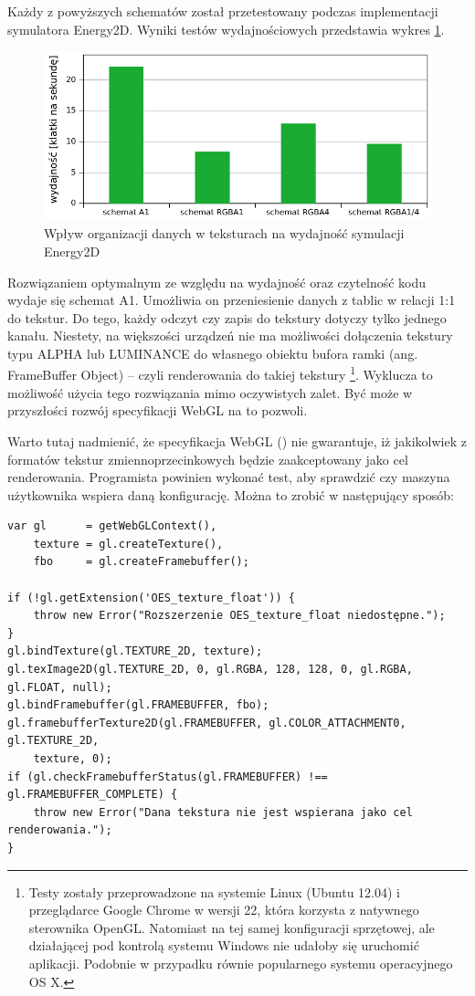 Każdy z powyższych schematów został przetestowany podczas implementacji
symulatora Energy2D. Wyniki testów wydajnościowych przedstawia wykres
\ref{fig:texPerf}.

\begin{figure}[hbp]
\centering
\includegraphics[width=.9\textwidth]{img/texPerf}
\caption{Wpływ organizacji danych w teksturach na wydajność symulacji Energy2D}
\label{fig:texPerf}
\end{figure}

Rozwiązaniem optymalnym ze względu na wydajność oraz czytelność kodu wydaje się
schemat A1. Umożliwia on przeniesienie danych z tablic w relacji 1:1 do tekstur.
Do tego, każdy odczyt czy zapis do tekstury dotyczy tylko jednego kanału.
Niestety, na większości urządzeń nie ma możliwości dołączenia tekstury typu
ALPHA lub LUMINANCE do własnego obiektu bufora ramki (ang. FrameBuffer Object)
-- czyli renderowania do takiej tekstury \footnote{Testy zostały przeprowadzone
na systemie Linux (Ubuntu 12.04) i przeglądarce Google Chrome w wersji 22, która
korzysta z natywnego sterownika OpenGL. Natomiast na tej samej konfiguracji
sprzętowej, ale działającej pod kontrolą systemu Windows nie udałoby się
uruchomić aplikacji. Podobnie w przypadku równie popularnego systemu
operacyjnego OS X.}. Wyklucza to możliwość użycia tego rozwiązania mimo
oczywistych zalet. Być może w przyszłości rozwój specyfikacji WebGL na to
pozwoli.

Warto tutaj nadmienić, że specyfikacja WebGL (\cite{WebGLSpec}) nie gwarantuje,
iż jakikolwiek z formatów tekstur zmiennoprzecinkowych będzie zaakceptowany jako
cel renderowania. Programista powinien wykonać test, aby sprawdzić czy maszyna
użytkownika wspiera daną konfigurację. Można to zrobić w następujący sposób:

\begin{lstlisting}[caption=Weryfikacja poprawności formatu i typu tekstury
używanej jako cel renderowania]
var gl 		= getWebGLContext(),
	texture = gl.createTexture(),
	fbo 	= gl.createFramebuffer();

if (!gl.getExtension('OES_texture_float')) {
	throw new Error("Rozszerzenie OES_texture_float niedostępne.");
}
gl.bindTexture(gl.TEXTURE_2D, texture);
gl.texImage2D(gl.TEXTURE_2D, 0, gl.RGBA, 128, 128, 0, gl.RGBA, gl.FLOAT, null);
gl.bindFramebuffer(gl.FRAMEBUFFER, fbo);
gl.framebufferTexture2D(gl.FRAMEBUFFER, gl.COLOR_ATTACHMENT0, gl.TEXTURE_2D, 
	texture, 0);
if (gl.checkFramebufferStatus(gl.FRAMEBUFFER) !== gl.FRAMEBUFFER_COMPLETE) {
	throw new Error("Dana tekstura nie jest wspierana jako cel renderowania.");
}
\end{lstlisting}

